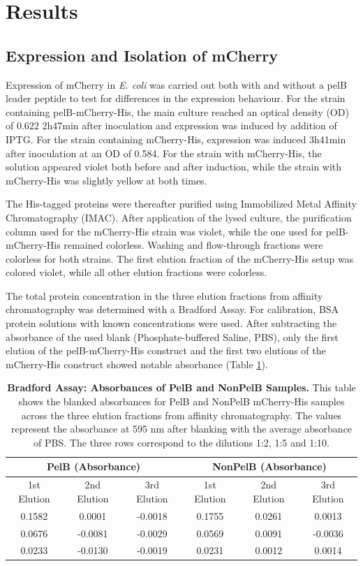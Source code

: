 \documentclass[a4paper,12pt]{article}
\begin{document}
\section{Results}
\subsection{Expression and Isolation of mCherry}
Expression of mCherry in \emph{E. coli} was carried out both with and without a pelB leader peptide to test for differences in the expression behaviour. For the strain containing pelB-mCherry-His, the main culture reached an optical density (OD) of 0.622 2h47min after inoculation and expression was induced by addition of IPTG. For the strain containing mCherry-His, expression was induced 3h41min after inoculation at an OD of 0.584. For the strain with mCherry-His, the solution appeared violet both before and after induction, while the strain with mCherry-His was slightly yellow at both times.

The His-tagged proteins were thereafter purified using Immobilized Metal Affinity Chromatography (IMAC). After application of the lysed culture, the purification column used for the mCherry-His strain was violet, while the one used for pelB-mCherry-His remained colorless. Washing and flow-through fractions were colorless for both strains. The first elution fraction of the mCherry-His setup was colored violet, while all other elution fractions were colorless. 

The total protein concentration in the three elution fractions from affinity chromatography was determined with a Bradford Assay. For calibration, BSA protein solutions with known concentrations were used. After subtracting the absorbance of the used blank (Phosphate-buffered Saline, PBS), only the first elution of the pelB-mCherry-His construct and the first two elutions of the mCherry-His construct showed notable absorbance (Table \ref{tab:bradford1}). 

\begin{table}[h!]
    \centering
    \caption{\textbf{Bradford Assay: Absorbances of PelB and NonPelB Samples.} This table shows the blanked absorbances for PelB and NonPelB mCherry-His samples across the three elution fractions from affinity chromatography. The values represent the absorbance at 595 nm after blanking with the average absorbance of PBS. The three rows correspond to the dilutions 1:2, 1:5 and 1:10.}
    \begin{tabular}{ccc|ccc}
        \multicolumn{3}{c|}{\textbf{PelB (Absorbance)}} & \multicolumn{3}{c}{\textbf{NonPelB (Absorbance)}} \\
        \hline
        1st Elution & 2nd Elution & 3rd Elution & 1st Elution & 2nd Elution & 3rd Elution \\
        \hline
        0.1582 & 0.0001 & -0.0018 & 0.1755 & 0.0261 & 0.0013 \\
        0.0676 & -0.0081 & -0.0029 & 0.0569 & 0.0091 & -0.0036 \\
        0.0233 & -0.0130 & -0.0019 & 0.0231 & 0.0012 & 0.0014
    \end{tabular}
    \label{tab:bradford1}
\end{table}
\end{document}
